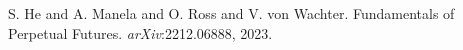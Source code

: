 \documentclass[10pt]{article}
\begin{document}
\begin{thebibliography}{10}

S. He and A. Manela and O. Ross and V. von Wachter. Fundamentals of Perpetual Futures. {\em arXiv}:2212.06888, 2023.

%
%
%
%
%
%
%
%
%
%
%
%
%


\end{thebibliography}
\end{document}
